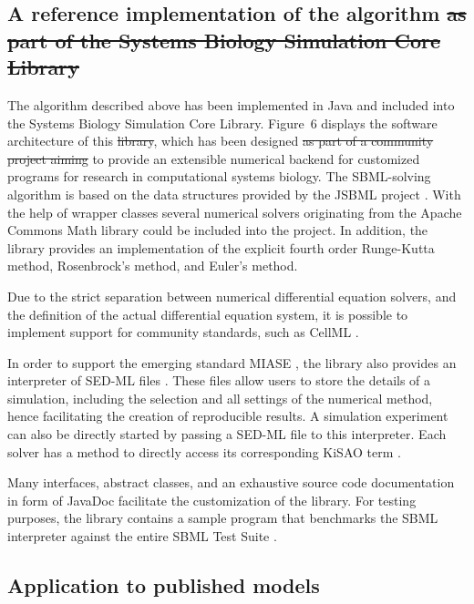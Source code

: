 \documentclass[10pt]{bmc_article}
\newenvironment{bmcformat}{\fussy\setboolean{publ}{true}}{\fussy}
\begin{document}
\begin{bmcformat}
\subsection*{A reference implementation of the algorithm \sout{as part of the Systems
Biology Simulation Core Library}}

The algorithm described above has been implemented in Java\texttrademark{} and
included into the Systems Biology Simulation Core Library.
Figure~6 displays  the software architecture of this
\sout{library}, which has been designed 
\sout{as part of a community project aiming}
to provide an extensible numerical backend for customized programs for research
in computational systems biology.
The \acs{SBML}-solving algorithm is based on the data structures provided by the
JSBML project \cite{Draeger2008}.
With the help of wrapper classes several numerical solvers originating from the
Apache Commons Math library  could be included
into the project.
In addition, the library provides an implementation of the explicit fourth order
Runge-Kutta method, Rosenbrock's method, and Euler's method.

Due to the strict separation between numerical differential equation solvers,
and the definition of the actual differential equation system, it is possible to
implement support for  community standards, such as CellML
\cite{Lloyd2004}.

In order to support the emerging standard \acf{MIASE} \cite{Waltemath2011a}, the
library also provides an interpreter of \acf{SED-ML} files \cite{Waltemath2011}.
These files allow users to store the details of a simulation, including the
selection and all settings of the numerical method, hence facilitating the
creation of reproducible results.
A simulation experiment can also be directly started by passing a \acs{SED-ML}
file to this interpreter.
Each solver has a method to directly access its corresponding \acf{KiSAO} term
\cite{Courtot2011} .

Many interfaces, abstract classes, and an exhaustive source code documentation
in  form of JavaDoc facilitate the customization of the library.
For testing purposes, the library contains a sample program that benchmarks the
\acs{SBML} interpreter against the entire SBML Test Suite .


\subsection*{Application to published models}


\end{bmcformat}
\end{document}

